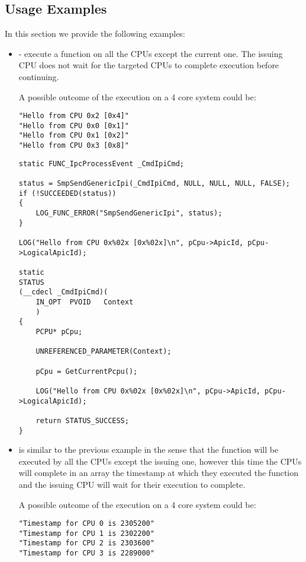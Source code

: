 \begin{appendices}
\subsection{Usage Examples}
\label{sect:SmpIpiExamples}

In this section we provide the following examples:
\begin{itemize}
	\item {} - execute a function on all the CPUs except the current one. The issuing CPU does not wait for the targeted CPUs to complete execution before continuing.

	A possible outcome of the execution on a 4 core system could be:

	\begin{verbatim}
"Hello from CPU 0x2 [0x4]"
"Hello from CPU 0x0 [0x1]"
"Hello from CPU 0x1 [0x2]"
"Hello from CPU 0x3 [0x8]"
	\end{verbatim}

	\begin{lstlisting}[caption={All the CPUs except the current one - no information passing},label={lst:IpiExclSelfNoInfo}]
static FUNC_IpcProcessEvent _CmdIpiCmd;

status = SmpSendGenericIpi(_CmdIpiCmd, NULL, NULL, NULL, FALSE);
if (!SUCCEEDED(status))
{
    LOG_FUNC_ERROR("SmpSendGenericIpi", status);
}

LOG("Hello from CPU 0x%02x [0x%02x]\n", pCpu->ApicId, pCpu->LogicalApicId);

static
STATUS
(__cdecl _CmdIpiCmd)(
    IN_OPT  PVOID   Context
    )
{
    PCPU* pCpu;

    UNREFERENCED_PARAMETER(Context);

    pCpu = GetCurrentPcpu();

    LOG("Hello from CPU 0x%02x [0x%02x]\n", pCpu->ApicId, pCpu->LogicalApicId);

    return STATUS_SUCCESS;
}
	\end{lstlisting}

	\item {} is similar to the previous example in the sense that the function will be executed by all the CPUs except the issuing one, however this time the CPUs will complete in an array the timestamp at which they executed the function and the issuing CPU will wait for their execution to complete.

A possible outcome of the execution on a 4 core system could be:

	\begin{verbatim}
"Timestamp for CPU 0 is 2305200"
"Timestamp for CPU 1 is 2302200"
"Timestamp for CPU 2 is 2303600"
"Timestamp for CPU 3 is 2289000"
	\end{verbatim}	


\end{itemize}
\end{appendices}
